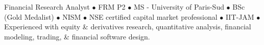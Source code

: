 %
%
%
\par{
Financial Research Analyst $\bullet$ FRM P2 $\bullet$ MS - University of Paris-Sud $\bullet$ BSc (Gold Medalist) $\bullet$ NISM $\bullet$ NSE certified capital market professional $\bullet$ IIT-JAM $\bullet$ Experienced with equity \& derivatives research, quantitative analysis, financial modeling, trading, \& financial software design.



}